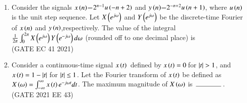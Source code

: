 \begin{enumerate}[label=\thechapter.\arabic*,ref=\thechapter.\theenumi]
\item Consider the signals $x\left(n\right)$=$2^{n-1} u\left( -n+2\right)$ and $y\left(n\right)$=$2^{-n+2}u\left( n+1\right)$, where $u\left(n\right)$ is the unit step sequence. Let $X\left(e^{j\omega}\right)$ and $Y\left(e^{j\omega}\right)$ be the discrete-time Fourier of $x\left(n\right)$ and $y\left(n\right)$,respectively. The value of the integral $\frac{1}{2\pi}\int_{0}^{2\pi} X\left(e^{j\omega}\right) Y\left(e^{-j\omega}\right) d \omega$
(rounded off to one decimal place) is \underline{{\hspace{1.5in}}}\\
\hfill{(GATE EC 41 2021)}\\
\solution

\pagebreak
\item Consider a continuous-time signal $x\left(t\right)$ \,defined by $x\left(t\right)=0$\,for $\left\vert t\right\vert>1$, and $x\left(t\right)=1-\left\vert t\right\vert$ for $\left\vert t\right\vert\le 1$. Let the Fourier transform of $x\left(t\right)$ be defined as $X\left(\omega\right)=\int_{-\infty}^{\infty}x\left(t\right)e^{-j\omega t} dt$. The maximum magnitude of $X\left(\omega\right)$ is $\hbox to 4em{\thinspace\hrulefill\thinspace}$.
\hfill{(GATE 2021 EE 43)}\\
\solution

\pagebreak
\end{enumerate}
